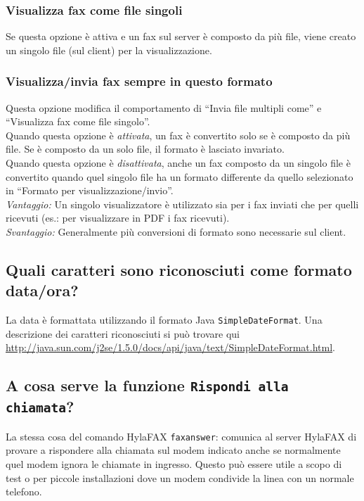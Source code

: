 \documentclass[a4paper,10pt]{scrartcl}
\begin{document}
\subsubsection{Visualizza fax come file singoli}
Se questa opzione è attiva e un fax sul server è composto da più file, viene creato un singolo file (sul client) per la visualizzazione.


\subsubsection{Visualizza/invia fax sempre in questo formato}
Questa opzione modifica il comportamento di ``Invia file multipli come'' e ``Visualizza fax come file singolo''.\\
Quando questa opzione è \textit{attivata}, un fax è convertito solo se è composto da più file. Se è composto da un solo file, il formato è lasciato invariato.\\
Quando questa opzione è \textit{disattivata}, anche un fax composto da un singolo file è convertito quando quel singolo file ha un formato differente da quello selezionato in ``Formato per visualizzazione/invio''.\\
\textit{Vantaggio:} Un singolo visualizzatore è utilizzato sia per i fax inviati che per quelli ricevuti (es.: per visualizzare in PDF i fax ricevuti).\\
\textit{Svantaggio:} Generalmente più conversioni di formato sono necessarie sul client.

\subsection{Quali caratteri sono riconosciuti come formato data/ora?}

La data è formattata utilizzando il formato Java \texttt{SimpleDateFormat}. Una descrizione dei caratteri riconosciuti si può trovare qui \url{http://java.sun.com/j2se/1.5.0/docs/api/java/text/SimpleDateFormat.html}.

\subsection{A cosa serve la funzione \texttt{Rispondi alla chiamata}?}

La stessa cosa del comando HylaFAX \verb#faxanswer#: comunica al server HylaFAX di provare a rispondere alla chiamata sul modem indicato anche se normalmente quel modem ignora le chiamate in ingresso. Questo può essere utile a scopo di test o per piccole installazioni dove un modem condivide la linea con un normale telefono.
\end{document}
